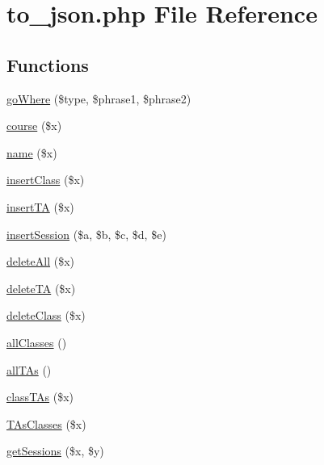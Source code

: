 \hypertarget{to__json_8php}{\section{to\-\_\-json.\-php File Reference}
\label{to__json_8php}
}
\subsection*{Functions}
\begin{DoxyCompactItemize}
\item 
\hyperlink{to__json_8php_a3e0f5d22777229fda3bf2436fceb5052}{go\-Where} (\$type, \$phrase1, \$phrase2)
\item 
\hyperlink{to__json_8php_a21a32dfbb386a031c794ef93fc8ebd9e}{course} (\$x)
\item 
\hyperlink{to__json_8php_a3fa12e08db73bac89646ae7423f7517f}{name} (\$x)
\item 
\hyperlink{to__json_8php_a90618313f9abbec5ed1db3be24f6de28}{insert\-Class} (\$x)
\item 
\hyperlink{to__json_8php_a54c8d95fb34384beba3230acdbd7028a}{insert\-T\-A} (\$x)
\item 
\hyperlink{to__json_8php_a455e607a715024aca97e9b488a6c15bc}{insert\-Session} (\$a, \$b, \$c, \$d, \$e)
\item 
\hyperlink{to__json_8php_a54d7604ec0112e70aebb6d812577c972}{delete\-All} (\$x)
\item 
\hyperlink{to__json_8php_ad9d38c29e8671868b316910596c4222e}{delete\-T\-A} (\$x)
\item 
\hyperlink{to__json_8php_a12652b337cd14db60bd40e7aa5e7452f}{delete\-Class} (\$x)
\item 
\hyperlink{to__json_8php_a753d4e599d996d0115b05bb02bb2ce23}{all\-Classes} ()
\item 
\hyperlink{to__json_8php_a9a1487ee9e5f545418a96dbbdf190af3}{all\-T\-As} ()
\item 
\hyperlink{to__json_8php_a1b3f36f129e6fc976dc1b9fdb61fad81}{class\-T\-As} (\$x)
\item 
\hyperlink{to__json_8php_a0f2f2e2d57b098205d2ee4226a69cd43}{T\-As\-Classes} (\$x)
\item 
\hyperlink{to__json_8php_a338ed5451916d357e95a2b1ae26232d8}{get\-Sessions} (\$x, \$y)
\end{DoxyCompactItemize}


